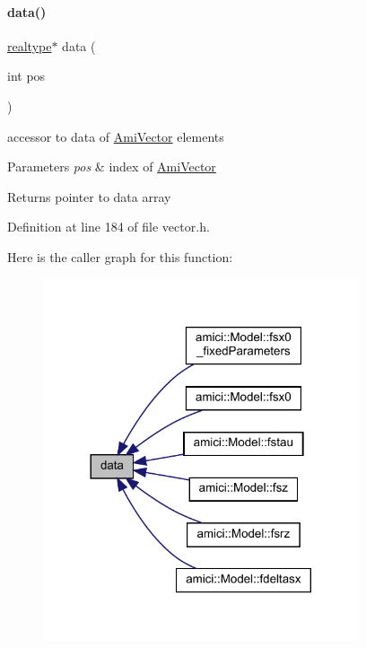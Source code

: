\paragraph{\texorpdfstring{data()}{data()}\hspace{0.1cm}{\footnotesize\ttfamily [1/2]}}
{\footnotesize\ttfamily \mbox{\hyperlink{namespaceamici_a1bdce28051d6a53868f7ccbf5f2c14a3}{realtype}}$\ast$ data (\begin{DoxyParamCaption}\item[{int}]{pos }\end{DoxyParamCaption})}

accessor to data of \mbox{\hyperlink{classamici_1_1_ami_vector}{Ami\+Vector}} elements 
\begin{DoxyParams}{Parameters}
{\em pos} & index of \mbox{\hyperlink{classamici_1_1_ami_vector}{Ami\+Vector}} \\
\hline
\end{DoxyParams}
\begin{DoxyReturn}{Returns}
pointer to data array 
\end{DoxyReturn}


Definition at line 184 of file vector.\+h.

Here is the caller graph for this function\+:
\nopagebreak
\begin{figure}[H]
\begin{center}
\leavevmode
\includegraphics[width=264pt]{classamici_1_1_ami_vector_array_a5c1b7077b31d3a3be1370ea3e42d13a3_icgraph}
\end{center}
\end{figure}
\mbox{\label{classamici_1_1_ami_vector_array_a862fe8497e94d2fac86e92a07db04cd7}} 
